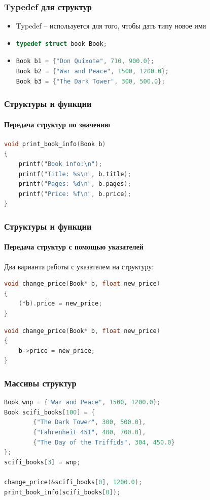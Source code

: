 \documentclass[12pt,pdf,hyperref={unicode}]{beamer}
\begin{document}
\begin{frame}[fragile]
\frametitle{Typedef для структур} 
\begin{itemize}
\item Typedef -- используется для того, чтобы дать типу новое имя \\
\item 
\begin{lstlisting}[language=C++,basicstyle=\ttfamily,keywordstyle=\color{blue}]
typedef struct book Book;
\end{lstlisting}
\item 
\begin{lstlisting}[language=C++,basicstyle=\ttfamily,keywordstyle=\color{blue}]
Book b1 = {"Don Quixote", 710, 900.0};
Book b2 = {"War and Peace", 1500, 1200.0};
Book b3 = {"The Dark Tower", 300, 500.0};
\end{lstlisting}
\end{itemize}
\end{frame}




\begin{frame}[fragile]
\frametitle{Структуры и функции} 
\framesubtitle{Передача структур по значению} 
\begin{lstlisting}[language=C++,basicstyle=\ttfamily,keywordstyle=\color{blue}]
void print_book_info(Book b)
{
    printf("Book info:\n");
    printf("Title: %s\n", b.title);
    printf("Pages: %d\n", b.pages);
    printf("Price: %f\n", b.price);
}
\end{lstlisting}
\end{frame}


\begin{frame}[fragile]
\frametitle{Структуры и функции} 
\framesubtitle{Передача структур с помощью указателей} 
Два варианта работы с указателем на структуру:
\begin{lstlisting}[language=C++,basicstyle=\ttfamily,keywordstyle=\color{blue}]
void change_price(Book* b, float new_price)
{
    (*b).price = new_price;
}
\end{lstlisting}
\begin{lstlisting}[language=C++,basicstyle=\ttfamily,keywordstyle=\color{blue}]
void change_price(Book* b, float new_price)
{
    b->price = new_price;
}
\end{lstlisting}
\end{frame}

\begin{frame}[fragile]
\frametitle{Массивы структур} 
\begin{lstlisting}[language=C++,basicstyle=\ttfamily,keywordstyle=\color{blue}]
Book wnp = {"War and Peace", 1500, 1200.0};
Book scifi_books[100] = {
        {"The Dark Tower", 300, 500.0}, 
        {"Fahrenheit 451", 400, 700.0},
        {"The Day of the Triffids", 304, 450.0}
};
scifi_books[3] = wnp;

change_price(&scifi_books[0], 1200.0);
print_book_info(scifi_books[0]);

\end{lstlisting}
\end{frame}
\end{document}
